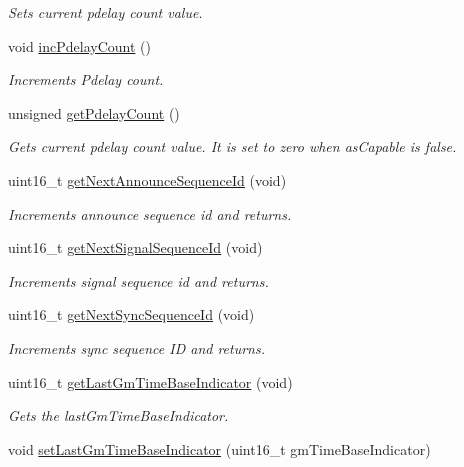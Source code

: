 \begin{DoxyCompactItemize}
\begin{DoxyCompactList}\small\item\em Sets current pdelay count value. \end{DoxyCompactList}\item 
void \hyperlink{class_common_port_a7d0d2b5b78e5c0847b37753bb359d6a4}{inc\+Pdelay\+Count} ()
\begin{DoxyCompactList}\small\item\em Increments Pdelay count. \end{DoxyCompactList}\item 
unsigned \hyperlink{class_common_port_acb83433716949af5f97d373d8ca6ee8d}{get\+Pdelay\+Count} ()
\begin{DoxyCompactList}\small\item\em Gets current pdelay count value. It is set to zero when as\+Capable is false. \end{DoxyCompactList}\item 
uint16\+\_\+t \hyperlink{class_common_port_a18883d9fb2db39824c9c291e142955f9}{get\+Next\+Announce\+Sequence\+Id} (void)
\begin{DoxyCompactList}\small\item\em Increments announce sequence id and returns. \end{DoxyCompactList}\item 
uint16\+\_\+t \hyperlink{class_common_port_abf938254e2cf21f85fbf20f1287e5e31}{get\+Next\+Signal\+Sequence\+Id} (void)
\begin{DoxyCompactList}\small\item\em Increments signal sequence id and returns. \end{DoxyCompactList}\item 
uint16\+\_\+t \hyperlink{class_common_port_a05aaa48d87d2fbb2f3c9be81a458119f}{get\+Next\+Sync\+Sequence\+Id} (void)
\begin{DoxyCompactList}\small\item\em Increments sync sequence ID and returns. \end{DoxyCompactList}\item 
uint16\+\_\+t \hyperlink{class_common_port_ab3a3494bfdbdad33855f665c9335ac64}{get\+Last\+Gm\+Time\+Base\+Indicator} (void)
\begin{DoxyCompactList}\small\item\em Gets the last\+Gm\+Time\+Base\+Indicator. \end{DoxyCompactList}\item 
void \hyperlink{class_common_port_a038a307b29400d98300cf0dd1674aa56}{set\+Last\+Gm\+Time\+Base\+Indicator} (uint16\+\_\+t gm\+Time\+Base\+Indicator)

\end{DoxyCompactItemize}
